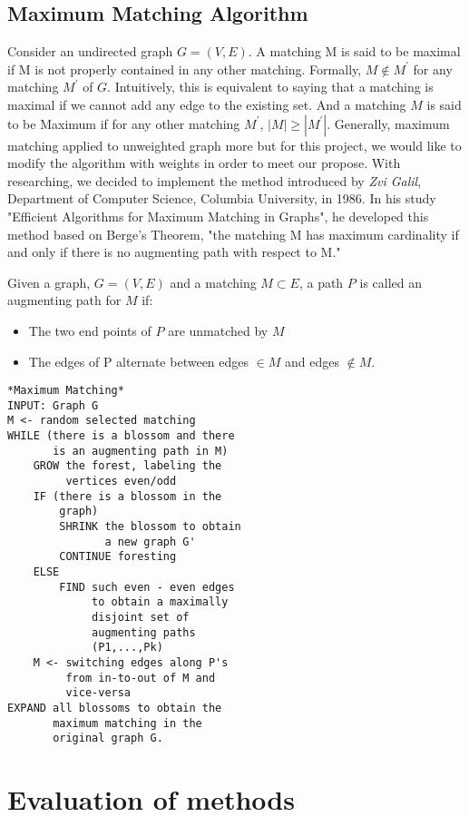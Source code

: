 \documentclass[twoside,twocolumn]{article}
\begin{document}
    \subsection{Maximum Matching Algorithm}
    Consider an undirected graph $G=(V,E)$. A matching M is said to be maximal if M is not properly contained in any other matching.
    Formally, $M\notin M^{'}$ for any matching $M^{'}$ of $G$. Intuitively, this is equivalent to saying that a matching is maximal 
    if we cannot add any edge to the existing set. And a matching $M$ is said to be Maximum if for any other matching $M^{'}$, 
    $|M|\geq |M^{'}|$. Generally, maximum matching applied to unweighted graph more but for this project,
    we would like to modify the algorithm with weights in order to meet our propose. With researching, we decided to implement the method
    introduced by \textit{Zvi Galil}, Department of Computer Science, Columbia University, in 1986. In his study "Efficient Algorithms
    for Maximum Matching in Graphs", he developed this method based on Berge's Theorem, "the matching M has maximum cardinality if and 
    only if there is no augmenting path with respect to M."

    \indent Given a graph, $G=(V,E)$ and a matching $M \subset E$, a path $P$ is called an augmenting path for $M$ if:
    \begin{itemize}
        \item The two end points of $P$ are unmatched by $M$
        \item The edges of P alternate between edges $\in M$ and edges $\notin M$.
    \end{itemize}
    
    \begin{lstlisting}
*Maximum Matching*
INPUT: Graph G
M <- random selected matching
WHILE (there is a blossom and there 
       is an augmenting path in M)
    GROW the forest, labeling the 
         vertices even/odd
    IF (there is a blossom in the 
        graph)
        SHRINK the blossom to obtain 
               a new graph G'
        CONTINUE foresting
    ELSE
        FIND such even - even edges 
             to obtain a maximally 
             disjoint set of 
             augmenting paths 
             (P1,...,Pk)
    M <- switching edges along P's 
         from in-to-out of M and 
         vice-versa
EXPAND all blossoms to obtain the 
       maximum matching in the 
       original graph G.

    \end{lstlisting}
    \section{Evaluation of methods}
\end{document}
